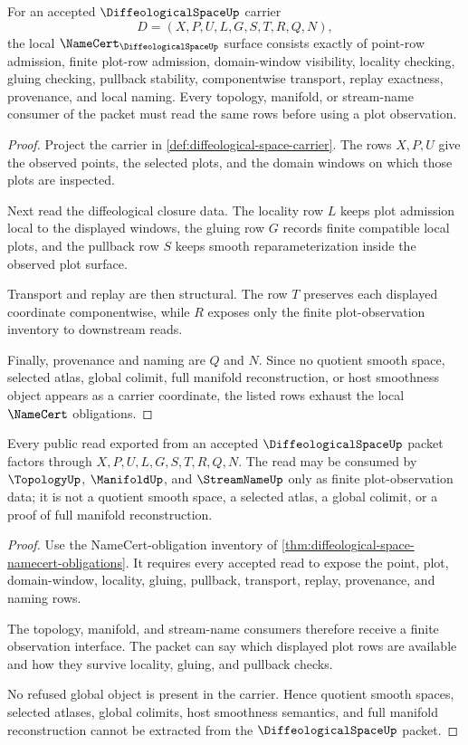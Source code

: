 \begin{theorem}
\label{thm:diffeological-space-namecert-obligations}
For an accepted $\DiffeologicalSpaceUp$ carrier
$$
D=(X,P,U,L,G,S,T,R,Q,N),
$$
the local $\NameCert_{\DiffeologicalSpaceUp}$ surface consists exactly of point-row admission, finite plot-row admission, domain-window visibility, locality checking, gluing checking, pullback stability, componentwise transport, replay exactness, provenance, and local naming. Every topology, manifold, or stream-name consumer of the packet must read the same rows before using a plot observation.
\end{theorem}
\begin{proof}
Project the carrier in \autoref{def:diffeological-space-carrier}. The rows $X,P,U$ give the observed points, the selected plots, and the domain windows on which those plots are inspected.

Next read the diffeological closure data. The locality row $L$ keeps plot admission local to the displayed windows, the gluing row $G$ records finite compatible local plots, and the pullback row $S$ keeps smooth reparameterization inside the observed plot surface.

Transport and replay are then structural. The row $T$ preserves each displayed coordinate componentwise, while $R$ exposes only the finite plot-observation inventory to downstream reads.

Finally, provenance and naming are $Q$ and $N$. Since no quotient smooth space, selected atlas, global colimit, full manifold reconstruction, or host smoothness object appears as a carrier coordinate, the listed rows exhaust the local $\NameCert$ obligations.
\end{proof}

\begin{theorem}
\label{thm:diffeological-space-plot-observation-nonescape}
Every public read exported from an accepted $\DiffeologicalSpaceUp$ packet factors through $X,P,U,L,G,S,T,R,Q,N$. The read may be consumed by $\TopologyUp$, $\ManifoldUp$, and $\StreamNameUp$ only as finite plot-observation data; it is not a quotient smooth space, a selected atlas, a global colimit, or a proof of full manifold reconstruction.
\end{theorem}
\begin{proof}
Use the NameCert-obligation inventory of \autoref{thm:diffeological-space-namecert-obligations}. It requires every accepted read to expose the point, plot, domain-window, locality, gluing, pullback, transport, replay, provenance, and naming rows.

The topology, manifold, and stream-name consumers therefore receive a finite observation interface. The packet can say which displayed plot rows are available and how they survive locality, gluing, and pullback checks.

No refused global object is present in the carrier. Hence quotient smooth spaces, selected atlases, global colimits, host smoothness semantics, and full manifold reconstruction cannot be extracted from the $\DiffeologicalSpaceUp$ packet.
\end{proof}

